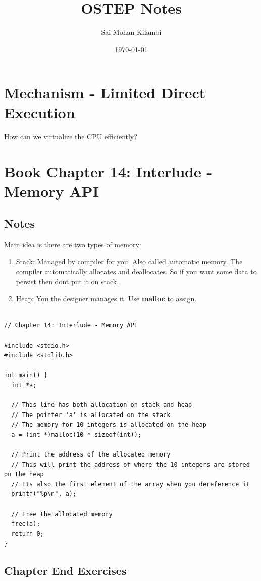 \documentclass[11pt]{article}
\title{OSTEP Notes}
\author{Sai Mohan Kilambi}
\date{\today}
\begin{document}
\maketitle

\setcounter{tocdepth}{4}
\tableofcontents

\newpage
\section{Mechanism - Limited Direct Execution}

How can we virtualize the CPU efficiently?

\section{Book Chapter 14: Interlude - Memory API}
\subsection{Notes}

Main idea is there are two types of memory:
\begin{enumerate}
	\item Stack: Managed by compiler for you. Also called automatic memory. The compiler automatically allocates and deallocates. So if you want some data to persist then dont put it on stack.
	\item Heap: You the designer manages it. Use \textbf{malloc} to assign.
\end{enumerate}


\begin{lstlisting}[style=cppstyle]
	
// Chapter 14: Interlude - Memory API

#include <stdio.h>
#include <stdlib.h>

int main() {
  int *a;

  // This line has both allocation on stack and heap
  // The pointer 'a' is allocated on the stack
  // The memory for 10 integers is allocated on the heap
  a = (int *)malloc(10 * sizeof(int));

  // Print the address of the allocated memory
  // This will print the address of where the 10 integers are stored on the heap
  // Its also the first element of the array when you dereference it
  printf("%p\n", a);

  // Free the allocated memory
  free(a);
  return 0;
}
\end{lstlisting}
\subsection{Chapter End Exercises}
\end{document}

